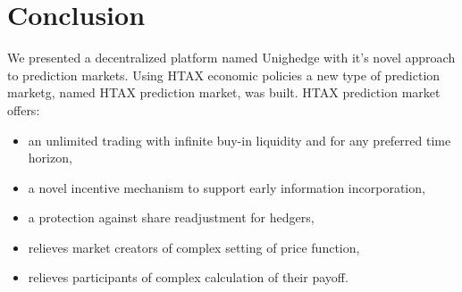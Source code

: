 \documentclass{article}
\begin{document}
	
	\section{Conclusion}
	
	We presented a decentralized platform named Unighedge with it's novel approach to prediction markets. Using HTAX economic policies a new type of prediction marketg, named HTAX prediction market, was built. HTAX prediction market offers: 
	
	\begin{itemize}
		\item an unlimited trading with infinite buy-in liquidity and for any preferred time horizon,
		\item a novel incentive mechanism to support early information incorporation,
		\item a protection against share readjustment for hedgers,
		\item relieves market creators of complex setting of price function,
		\item relieves participants of complex calculation of their payoff.  
	\end{itemize}
	
	
	 
	
	
\end{document}
